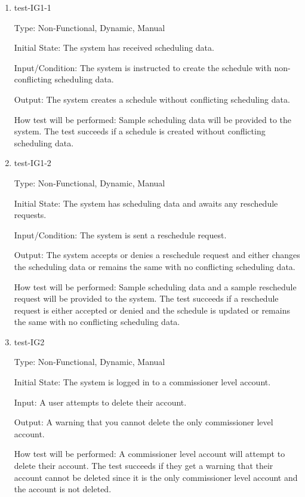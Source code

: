 \documentclass[12pt, titlepage]{article}
\begin{document}
\begin{enumerate}
  \item{test-IG1-1\\}

  Type: Non-Functional, Dynamic, Manual

  Initial State: The system has received scheduling data.

  Input/Condition: The system is instructed to create the schedule with non-conflicting
  scheduling data.

  Output: The system creates a schedule without conflicting scheduling data.

  How test will be performed: Sample scheduling data will be provided to the system. The test
  succeeds if a schedule is created without conflicting scheduling data.

  \item{test-IG1-2\\}

  Type: Non-Functional, Dynamic, Manual

  Initial State: The system has scheduling data and awaits any reschedule requests.

  Input/Condition: The system is sent a reschedule request.

  Output: The system accepts or denies a reschedule request and either changes the scheduling
  data or remains the same with no conflicting scheduling data.

  How test will be performed: Sample scheduling data and a sample reschedule request
  will be provided to the system. The test succeeds if a reschedule request is either accepted
  or denied and the schedule is updated or remains the same with no conflicting scheduling
  data.

  \item{test-IG2\\}

  Type: Non-Functional, Dynamic, Manual

  Initial State: The system is logged in to a commissioner level account.

  Input: A user attempts to delete their account.

  Output: A warning that you cannot delete the only commissioner level
  account.

  How test will be performed: A commissioner level account will attempt to
  delete their account. The test succeeds if they get a warning that their
  account cannot be deleted since it is the only commissioner level account
  and the account is not deleted.


\end{enumerate}
\end{document}
